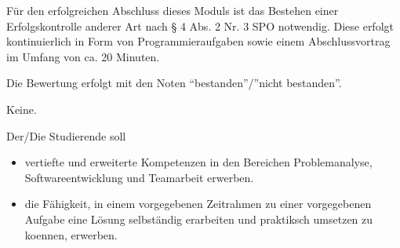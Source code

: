 \begin{module}

\setdoclanguagegerman
{}
\modulesubject{}





\modulehead


\label{mod_3071.dp_997}



\begin{styleenv}
\begin{assessment}
Für den erfolgreichen Abschluss dieses Moduls ist das Bestehen einer Erfolgskontrolle anderer Art nach § 4 Abs. 2 Nr. 3 SPO notwendig. Diese erfolgt kontinuierlich in Form von Programmieraufgaben sowie einem Abschlussvortrag im Umfang von ca. 20 Minuten.

 

Die Bewertung erfolgt mit den Noten “bestanden”/”nicht bestanden”.


\end{assessment}

\begin{conditions}Keine.\end{conditions}


\end{styleenv}

\begin{learningoutcomes}
Der/Die Studierende soll

 \begin{itemize}\item vertiefte und erweiterte Kompetenzen in den Bereichen Problemanalyse, Softwareentwicklung und Teamarbeit erwerben.  \item die Fähigkeit, in einem vorgegebenen Zeitrahmen zu einer vorgegebenen Aufgabe eine Lösung selbständig erarbeiten und praktiksch umsetzen zu koennen, erwerben.  \end{itemize}
\end{learningoutcomes}


\end{module}
